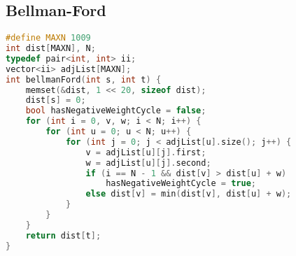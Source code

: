 \subsection{Bellman-Ford}
\begin{lstlisting}[language=C++]
#define MAXN 1009
int dist[MAXN], N;
typedef pair<int, int> ii;
vector<ii> adjList[MAXN];
int bellmanFord(int s, int t) {
    memset(&dist, 1 << 20, sizeof dist);
    dist[s] = 0;
    bool hasNegativeWeightCycle = false;
    for (int i = 0, v, w; i < N; i++) {
        for (int u = 0; u < N; u++) {
            for (int j = 0; j < adjList[u].size(); j++) {
                v = adjList[u][j].first;
                w = adjList[u][j].second;
                if (i == N - 1 && dist[v] > dist[u] + w)
                    hasNegativeWeightCycle = true;
                else dist[v] = min(dist[v], dist[u] + w);
            }
        }
    }
    return dist[t];
}
\end{lstlisting}